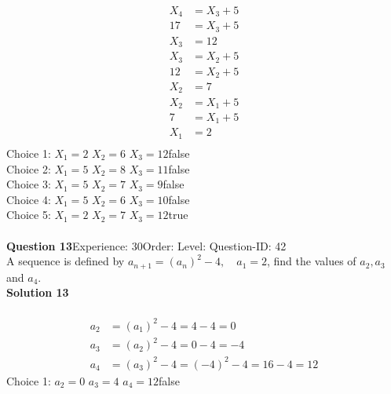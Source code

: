 \documentclass{article}
\begin{document}
\\[-35pt]\begin{align*}
X_4&=X_3+5\\[2pt]
17&=X_3+5\\[2pt]
X_3&=12\\[12pt]
X_3&=X_2+5\\[2pt]
12&=X_2+5\\[2pt]
X_2&=7\\[12pt]
X_2&=X_1+5\\[2pt]
7&=X_1+5\\[2pt]
X_1&=2\\[12pt]
\end{align*}
Choice 1: \hspace{20pt}$X_1=2 \,\, X_2=6 \,\, X_3=12$\hspace{20pt}false\\
Choice 2: \hspace{20pt}$X_1=5 \,\, X_2=8 \,\, X_3=11$\hspace{20pt}false\\
Choice 3: \hspace{20pt}$X_1=5 \,\, X_2=7 \,\, X_3=9$\hspace{20pt}false\\
Choice 4: \hspace{20pt}$X_1=5 \,\, X_2=6 \,\, X_3=10$\hspace{20pt}false\\
Choice 5: \hspace{20pt}$X_1=2 \,\, X_2=7 \,\, X_3=12$\hspace{20pt}true\\
\\[4pt]
\noindent\textbf{Question 13}\hspace{20pt}Experience: 30\hspace{20pt}Order: \hspace{20pt}Level: \hspace{20pt}Question-ID: 42\\[2pt]
A sequence is defined by $a_{n+1}=(a_n)^2-4, \quad a_1=2$, find the values of $a_2,a_3$ and $a_4$.\\[4pt]
\noindent\textbf{Solution 13}\\[2pt]
\\[-35pt]\begin{align*}
a_2&=(a_1)^2-4=4-4=0\\[2pt]
a_3&=(a_2)^2-4=0-4=-4\\[2pt]
a_4&=(a_3)^2-4=(-4)^2-4=16-4=12
\end{align*}
Choice 1: \hspace{20pt}$a_2=0 \,\, a_3=4 \,\, a_4=12 $\hspace{20pt}false\\
\end{document}
